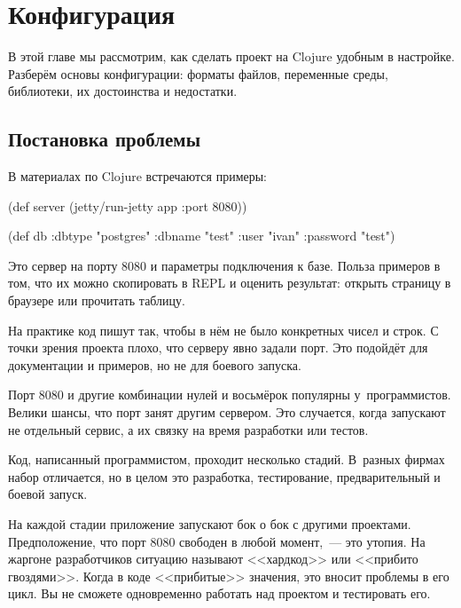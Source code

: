 \chapter{Конфигурация}


\label{chapter-config}

\begin{teaser}
В этой главе мы рассмотрим, как сделать проект на Clojure удобным в
настройке. Разберём основы конфигурации: форматы файлов, переменные среды,
библиотеки, их достоинства и недостатки.
\end{teaser}

\section{Постановка проблемы}

В материалах по Clojure встречаются примеры:

\begin{english}
  \begin{clojure}
(def server
  (jetty/run-jetty app {:port 8080}))

(def db {:dbtype   "postgres"
         :dbname   "test"
         :user     "ivan"
         :password "test"})
  \end{clojure}
\end{english}

Это сервер на порту 8080 и параметры подключения к базе. Польза примеров в том,
что их можно скопировать в REPL и оценить результат: открыть страницу в браузере
или прочитать таблицу.

На практике код пишут так, чтобы в нём не было конкретных чисел и строк. С точки
зрения проекта плохо, что серверу явно задали порт. Это подойдёт для
документации и примеров, но не для боевого запуска.

Порт 8080 и другие комбинации нулей и восьмёрок популярны
у~программистов. Велики шансы, что порт занят другим сервером. Это случается,
когда запускают не отдельный сервис, а их связку на время разработки или тестов.

Код, написанный программистом, проходит несколько стадий. В~разных фирмах набор
отличается, но в целом это разработка, тестирование, предварительный и боевой
запуск.

\label{hardcode}

На каждой стадии приложение запускают бок о бок с другими
проектами. Предположение, что порт 8080 свободен в любой момент,~--- это утопия. На
жаргоне разработчиков ситуацию называют <<хардкод>>  или <<прибито
гвоздями>>. Когда в коде <<прибитые>> значения, это вносит проблемы в его
цикл. Вы не сможете одновременно работать над проектом и тестировать его.

